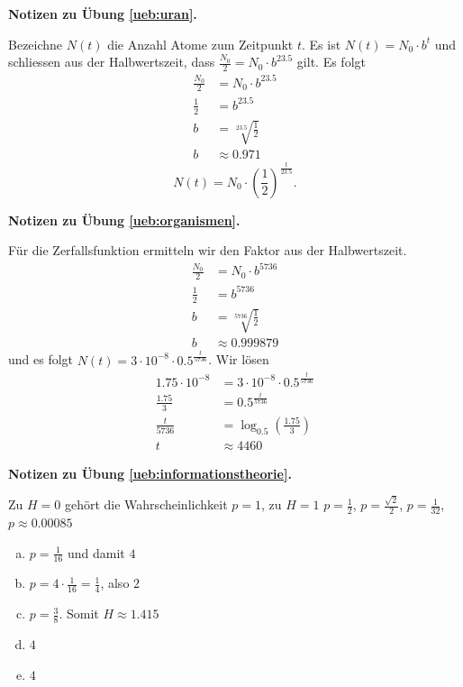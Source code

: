 \documentclass[%
11pt,%
twoside,%
titlepage,%
swissgerman,%
headsepline%
]{scrartcl}
\newcommand{\faReturnGray}{\textcolor{gray}{\faMailReply}} %
\theoremstyle{definition}
\theoremstyle{plain}
\newcommand{\concatueb}[1]{ueb:#1}%
\newcommand{\concatlsg}[1]{lsg:#1}%
\newenvironment{lsg}[1]{%
    \par\noindent\textbf{Notizen zu Übung \ref{\concatueb{#1}}.}%
    \label{\concatlsg{#1}} %
    \hfill\hyperref[\concatueb{#1}]{\faReturnGray}\par %
}{%
    \par%
}
\begin{document}
\begin{lsg}{uran}
    Bezeichne $N(t)$ die Anzahl Atome zum Zeitpunkt $t$. Es ist $N(t)=N_0\cdot b^t$ und schliessen aus der Halbwertszeit, dass $\frac{N_0}{2}=N_0\cdot b^{23.5}$ gilt. Es folgt
    \begin{align*}
        \frac{N_0}{2} &= N_0\cdot b^{23.5}\tag{$\div N_0$}\\
        \frac{1}{2} &= b^{23.5}\\
        b &= \sqrt[23.5]{\frac{1}{2}}\\
        b &\approx 0.971
    \end{align*}
    $$N(t)=N_0\cdot(\frac{1}{2})^\frac{t}{23.5}.$$
\end{lsg}

\begin{lsg}{organismen}
    Für die Zerfallsfunktion ermitteln wir den Faktor aus der Halbwertszeit.
    \begin{align*}
        \frac{N_0}{2} &= N_0\cdot b^{5736}\tag{$\div N_0$}\\
        \frac{1}{2} &= b^{5736}\\
        b &= \sqrt[5736]{\frac{1}{2}}\\
        b &\approx 0.999879
    \end{align*}
    und es folgt $N(t)=3\cdot10^{-8}\cdot 0.5^\frac{t}{5736}$. Wir lösen
    \begin{align*}
        1.75\cdot10^{-8} &= 3\cdot10^{-8}\cdot 0.5^\frac{t}{5736}\\
        \frac{1.75}{3} &= 0.5^\frac{t}{5736}\\
        \frac{t}{5736} &= \log_{0.5}(\frac{1.75}{3})\\
        t &\approx 4460
    \end{align*}
\end{lsg}
\begin{lsg}{informationstheorie}
Zu $H=0$ gehört die Wahrscheinlichkeit $p=1$, zu $H=1$ $p=\frac{1}{2}$, $p=\frac{\sqrt{2}}{2}$, $p=\frac{1}{32}$, $p\approx0.00085$
    \begin{enumerate}[a)]
        \item $p=\frac{1}{16}$ und damit $4$
        \item $p=4\cdot\frac{1}{16}=\frac{1}{4}$, also $2$
        \item $p=\frac{3}{8}$. Somit $H\approx1.415$
        \item $4$
        \item $4$
    \end{enumerate}
\end{lsg}
\end{document}
